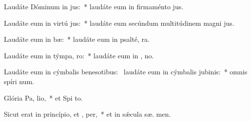 \item Laudáte Dóminum in  jus:~* laudáte eum in firmaménto  jus.
\item Laudáte eum in virtú jus:~* laudáte eum secúndum multitúdinem magni jus.
\item Laudáte eum in  bæ:~* laudáte eum in psalté,  ra.
\item Laudáte eum in týmpa,  ro:~* laudáte eum in ,  no.
\item Laudáte eum in cýmbalis benesotibus:~\pscross{} laudáte eum in cýmbalis jubinis:~* omnis spíri  num.
\item Glória Pa,  lio,~* et Spi to.
\item Sicut erat in princípio, et ,  per,~* et in sǽcula sæ. men.
